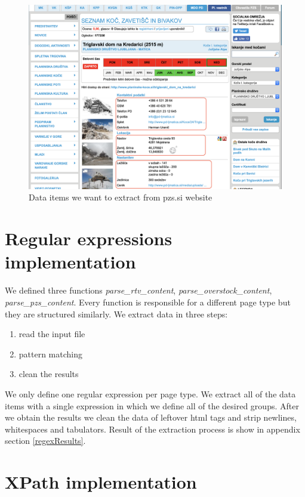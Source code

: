 \documentclass[runningheads]{llncs}
\begin{document}
\begin{figure}[H]
\begin{center}
\includegraphics[scale=0.4]{pzs.png}
\caption{Data items we want to extract from pzs.si website}
\label{fig:Slika1}
\end{center}
\end{figure}

\section{Regular expressions implementation}
We defined three functions {\em parse\_rtv\_content},  {\em parse\_overstock\_content},  {\em parse\_pzs\_content}. Every function is responsible for a different page type but they are structured similarly. We extract data in three steps:
\begin{enumerate}
   \item read the input file
   \item pattern matching
   \item clean the results
\end{enumerate}
We only define one regular expression per page type. We extract all of the data items with a single expression in which we define all of the desired groups. After we obtain the results we clean the data of leftover html tags and strip newlines, whitespaces and tabulators. Result of the extraction process is show in appendix section \ref{regexResults}.

\section{XPath implementation}
\end{document}
